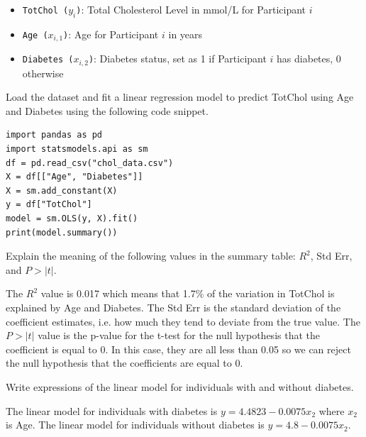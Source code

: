 \documentclass{article}
\begin{document}
\begin{probset}
\begin{prob} 
    \begin{itemize}
        \item \texttt{TotChol ($y_i$)}: Total Cholesterol Level in mmol/L for Participant $i$
        \item \texttt{Age ($x_{i,1}$)}: Age for Participant $i$ in years
        \item \texttt{Diabetes ($x_{i,2}$)}: Diabetes status, set as 1 if Participant $i$ has diabetes, 0 otherwise
    \end{itemize}

    Load the dataset and fit a linear regression model to predict TotChol using Age and Diabetes using the following code snippet.

    \begin{lstlisting}
import pandas as pd
import statsmodels.api as sm
df = pd.read_csv("chol_data.csv")
X = df[["Age", "Diabetes"]]
X = sm.add_constant(X)
y = df["TotChol"]
model = sm.OLS(y, X).fit()
print(model.summary())
    \end{lstlisting}

    \begin{subprobset}
        \begin{subprob}
            Explain the meaning of the following values in the summary table: $R^2$, Std Err, and $P > |t|$.

            \begin{soln}
                The $R^2$ value is 0.017 which means that 1.7\% of the variation in TotChol is explained by Age and Diabetes. The Std Err is the standard deviation of the coefficient estimates, i.e. how much they tend to deviate from the true value. The $P > |t|$ value is the p-value for the t-test for the null hypothesis that the coefficient is equal to 0. In this case, they are all less than 0.05 so we can reject the null hypothesis that the coefficients are equal to 0.
            \end{soln}
        \end{subprob}

        \begin{subprob}
            Write expressions of the linear model for individuals with and without diabetes.

            \begin{soln}
                The linear model for individuals with diabetes is $y = 4.4823 - 0.0075x_2$ where $x_2$ is Age. The linear model for individuals without diabetes is $y = 4.8 - 0.0075 x_2$.
            \end{soln}
        \end{subprob}


\end{subprobset}
\end{prob}
\end{probset}
\end{document}
